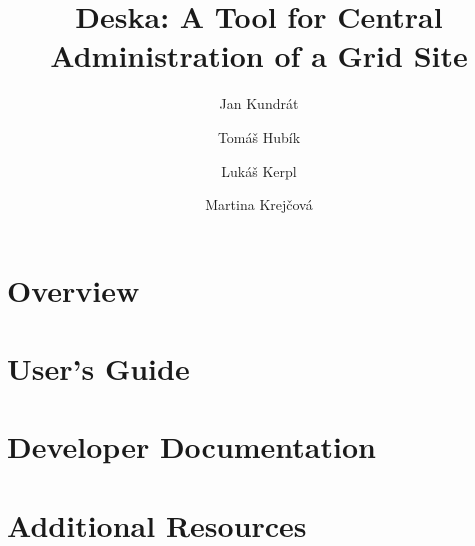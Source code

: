 \documentclass{book}
\begin{document}
\title{Deska: A Tool for Central Administration of a Grid Site}

\author{Jan Kundrát \and Tomáš Hubík \and Lukáš Kerpl \and Martina Krejčová}

\maketitle

\setcounter{tocdepth}{3}
\tableofcontents
\listoftodos

\part{Overview}



\part{User's Guide}






\part{Developer Documentation}











\part{Additional Resources}





\end{document}
